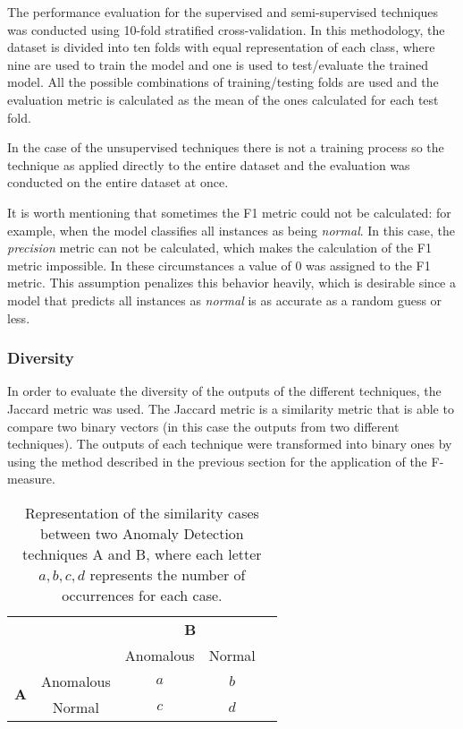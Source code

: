 The performance evaluation for the supervised and semi-supervised techniques was conducted using 10-fold stratified cross-validation.
In this methodology, the dataset is divided into ten folds with equal representation of each class, where nine are used to train the model and one is used to test/evaluate the trained model.
All the possible combinations of training/testing folds are used and the evaluation metric is calculated as the mean of the ones calculated for each test fold.

In the case of the unsupervised techniques there is not a training process so the technique as applied directly to the entire dataset and the evaluation was conducted on the entire dataset at once.

It is worth mentioning that sometimes the F1 metric could not be calculated: for example, when the model classifies all instances as being \textit{normal}.
In this case, the \textit{precision} metric can not be calculated, which makes the calculation of the F1 metric impossible.
In these circumstances a value of 0 was assigned to the F1 metric.
This assumption penalizes this behavior heavily, which is desirable since a model that predicts all instances as \textit{normal} is as accurate as a random guess or less.

\subsubsection{Diversity}

In order to evaluate the diversity of the outputs of the different techniques, the Jaccard metric \cite{similaritymeasures} was used.
The Jaccard metric is a similarity metric that is able to compare two binary vectors (in this case the outputs from two different techniques).
The outputs of each technique were transformed into binary ones by using the method described in the previous section for the application of the F-measure.

\begin{table}[!ht]
	\centering
	\caption{Representation of the similarity cases between two Anomaly Detection techniques A and B, where each letter $a,b,c,d$ represents the number of occurrences for each case.}
	\label{tab:jsimilarity}
	{\renewcommand{\arraystretch}{1.3}
		\begin{tabular}{cc|c|c|c}
			\cline{3-4}
			&  & \multicolumn{2}{c|}{\textbf{B}} &  \\ \cline{3-4}
			&  & Anomalous & Normal &  \\ \cline{1-4}
			\multicolumn{1}{|c|}{\multirow{2}{*}{\textbf{A}}} & Anomalous & $a$ & $b$ &  \\ \cline{2-4}
			\multicolumn{1}{|c|}{} & Normal & $c$ & $d$ &  \\ \cline{1-4}
	\end{tabular} }
\end{table}

